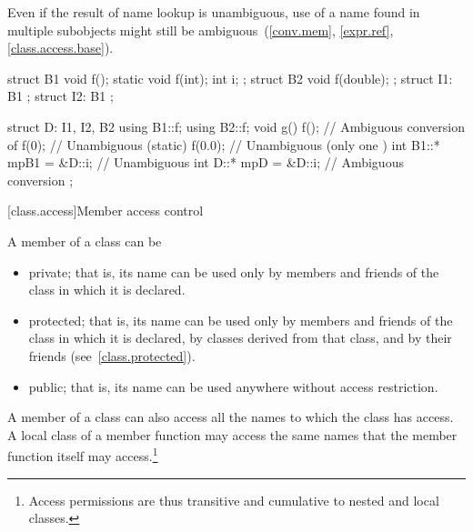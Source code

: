 \pnum
\begin{note}
Even if the result of name lookup is unambiguous, use of a name found in
multiple subobjects might still be
ambiguous~(\ref{conv.mem}, \ref{expr.ref}, \ref{class.access.base}).
\end{note}
\begin{example}
\begin{codeblock}
struct B1 {
  void f();
  static void f(int);
  int i;
};
struct B2 {
  void f(double);
};
struct I1: B1 { };
struct I2: B1 { };

struct D: I1, I2, B2 {
  using B1::f;
  using B2::f;
  void g() {
    f();                        // Ambiguous conversion of 
    f(0);                       // Unambiguous (static)
    f(0.0);                     // Unambiguous (only one )
    int B1::* mpB1 = &D::i;     // Unambiguous
    int D::* mpD = &D::i;       // Ambiguous conversion
  }
};
\end{codeblock}
\end{example}

[class.access]{Member access control}%


\pnum
A member of a class can be
\begin{itemize}
\item
{}%
private;
that is, its name can be used only by members and friends
of the class in which it is declared.
\item
{}%
protected;
that is, its name can be used only by members and friends
of the class in which it is declared, by classes derived from that class, and by their
friends (see~\ref{class.protected}).
\item
{}%
public;
that is, its name can be used anywhere without access restriction.
\end{itemize}

\pnum
A member of a class can also access all the names to which the class has access.
A local class of a member function may access
the same names that the member function itself may access.\footnote{Access
permissions are thus transitive and cumulative to nested
and local classes.}

